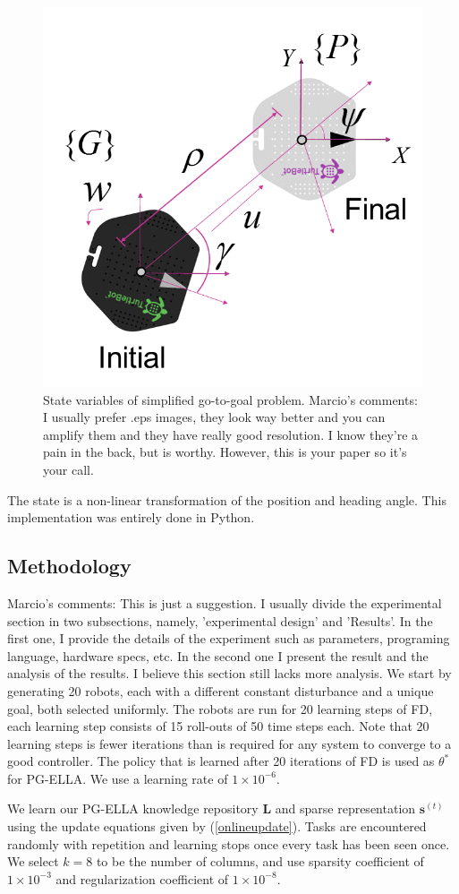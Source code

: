 \documentclass{aamas2016}
\begin{document}
\begin{figure}[!htbp]
    \centering
        \includegraphics[width=.45\textwidth]{images/unicycle.png}
        \caption{State variables of simplified go-to-goal problem. {\color{red} Marcio's comments: I usually prefer .eps images, 
        they look way better and you can amplify them and they have really good resolution. I know they're a pain in the back, but is worthy.
        However, this is your paper so it's your call.}}\label{fig:numfeat}
\end{figure}
The state is a non-linear transformation of the position and heading angle. This implementation was entirely done in Python.

\subsection{Methodology}
{\color{red} Marcio's comments: This is just a suggestion. I usually divide the experimental section in two subsections, namely,
'experimental design' and 'Results'. In the first one, I provide the details of the experiment such as parameters, programing language, hardware
specs, etc. In the second one I present the result and the analysis of the results. I believe this section still lacks more analysis.}
We start by generating 20 robots, each with a different constant disturbance and a unique goal, both selected uniformly. The robots are run for 20 learning steps of FD, each learning step consists of 15 roll-outs of 50 time steps each. Note that 20 learning steps is fewer iterations than is required for any system to converge to a good controller. The policy that is learned after 20 iterations of FD is used as $\theta^*$ for PG-ELLA. We use a learning rate of $1\times 10^{-6}$.

We learn our PG-ELLA knowledge repository $\bm{L}$ and sparse representation $\bm{s}^{(t)}$ using the update equations given 
by (\ref{onlineupdate}). Tasks are encountered randomly with repetition and learning stops once every task has been seen 
once. We select $k=8$ to be the number of columns, and use sparsity coefficient of $1\times 10^{-3}$ and regularization coefficient of 
$1\times 10^{-8}$.
\end{document}
